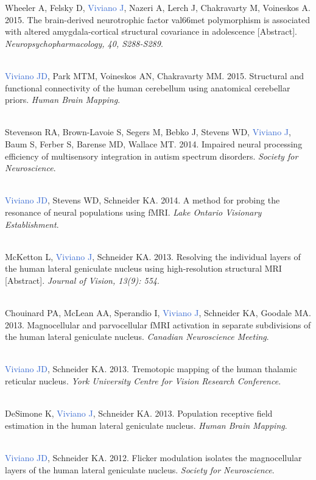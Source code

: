 \documentclass[a4paper,11pt,oneside]{book}
\begin{document}
\begin{flushleft}
Wheeler A, Felsky D, \textcolor{highlight}{Viviano J}, Nazeri A, Lerch J, Chakravarty M, Voineskos A. 2015. The brain-derived neurotrophic factor val66met polymorphism is associated with altered amygdala-cortical structural covariance in adolescence [Abstract]. \textit{Neuropsychopharmacology, 40, S288-S289}. \\\

\textcolor{highlight}{Viviano JD}, Park MTM, Voineskos AN, Chakravarty MM. 2015. Structural and functional connectivity of the human cerebellum using anatomical cerebellar priors. \textit{Human Brain Mapping}. \\\

Stevenson RA, Brown-Lavoie S, Segers M, Bebko J, Stevens WD, \textcolor{highlight}{Viviano J}, Baum S, Ferber S, Barense MD, Wallace MT. 2014. Impaired neural processing efficiency of multisensory integration in autism spectrum disorders. \textit{Society for Neuroscience}. \\\

\textcolor{highlight}{Viviano JD}, Stevens WD, Schneider KA. 2014. A method for probing the resonance of neural populations using fMRI. \textit{Lake Ontario Visionary Establishment}. \\\

McKetton L, \textcolor{highlight}{Viviano J}, Schneider KA. 2013. Resolving the individual layers of the human lateral geniculate nucleus using high-resolution structural MRI [Abstract]. \textit{Journal of Vision, 13(9): 554}. \\\

Chouinard PA, McLean AA, Sperandio I, \textcolor{highlight}{Viviano J}, Schneider KA, Goodale MA. 2013. Magnocellular and parvocellular fMRI activation in separate subdivisions of the human lateral geniculate nucleus. \textit{Canadian Neuroscience Meeting}. \\\

\textcolor{highlight}{Viviano JD}, Schneider KA. 2013. Tremotopic mapping of the human thalamic reticular nucleus. \textit{York University Centre for Vision Research Conference}. \\\

DeSimone K, \textcolor{highlight}{Viviano J}, Schneider KA. 2013. Population receptive field estimation in the human lateral geniculate nucleus. \textit{Human Brain Mapping}. \\\

\textcolor{highlight}{Viviano JD}, Schneider KA. 2012. Flicker modulation isolates the magnocellular layers of the human lateral geniculate nucleus. \textit{Society for Neuroscience}. \\\


\end{flushleft}
\end{document}
